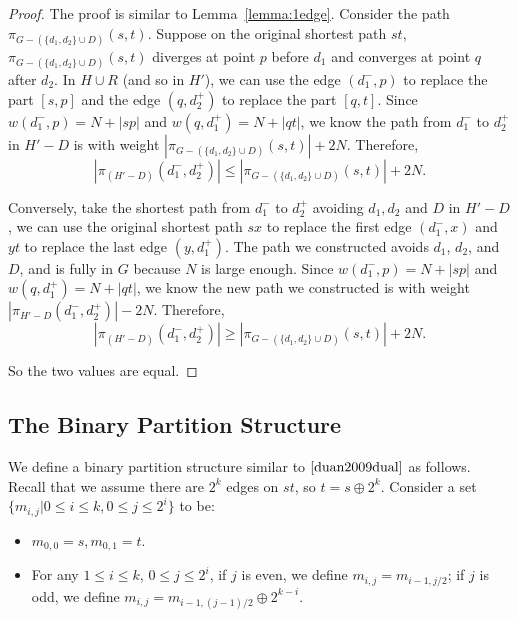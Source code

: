 \documentclass[11pt]{article}
\theoremstyle{plain}
\theoremstyle{definition}
\newcommand{\set}[1]{\{ #1 \}}
\newcommand{\og}[3]{\pi_{G-#3}\left(#1,#2\right)}
\begin{document}
\begin{center}
\begin{tikzpicture}[x=0.75pt,y=0.75pt,yscale=-1,xscale=1]
\end{tikzpicture}
 \end{center}

\begin{proof}
    The proof is similar to Lemma~\ref{lemma:1edge}. Consider the path $\og{s}{t}{(\set{d_1, d_2}\cup D)}$. Suppose on the original shortest path $st$, $\og{s}{t}{(\set{d_1, d_2}\cup D)}$ diverges at point $p$ before $d_1$ and converges at point $q$ after $d_2$. In $H \cup R$ (and so in $H'$), we can use the edge $(d_1^-,p)$ to replace the part $[s,p]$ and the edge $(q,d_2^+)$ to replace the part $[q,t]$. Since $w(d_1^-,p) = N + |sp|$ and $w(q,d_1^+) = N + |qt|$, we know the path from $d_1^-$ to $d_2^+$ in $H'-D$ is with weight $|\og{s}{t}{(\set{d_1, d_2}\cup D)}|+2N$. Therefore, 
    \[|\pi_{(H'-D)}(d_1^-, d_2^+)| \leq |\og{s}{t}{(\set{d_1, d_2}\cup D)}|+2N.\]

    Conversely, take the shortest path from $d_1^-$ to $d_2^+$ avoiding $d_1,d_2$ and $D$ in $H'-D$, we can use the original shortest path $sx$ to replace the first edge $(d_1^-,x)$ and $yt$ to replace the last edge $(y,d_1^+)$. The path we constructed avoids $d_1$, $d_2$, and $D$, and is fully in $G$ because $N$ is large enough. Since $w(d_1^-,p) = N + |sp|$ and $w(q,d_1^+) = N + |qt|$, we know the new path we constructed is with weight $|\pi_{H'-D}(d_1^-, d_2^+)|-2N$. Therefore, 
    \[|\pi_{(H'-D)}(d_1^-, d_2^+)| \geq |\og{s}{t}{(\set{d_1, d_2}\cup D)}|+2N.\]

    So the two values are equal.
\end{proof}



\subsection{The Binary Partition Structure}
\label{sec:binary}

We define a binary partition structure similar to $\cite{duan2009dual}$ as follows. Recall that we assume there are $2^k$ edges on $st$, so $t=s \oplus 2^k$. Consider a set $\set{m_{i,j}|0 \leq i \leq k, 0 \leq j \leq 2^i}$ to be:

\begin{itemize}
    \item $m_{0,0} = s, m_{0,1}=t$.
    \item For any $1 \leq i \leq k$, $0 \leq j \leq 2^i$, if $j$ is even, we define $m_{i,j}=m_{i-1,j/2}$; if $j$ is odd, we define $m_{i,j}=m_{i-1,(j-1)/2} \oplus 2^{k-i}$.
\end{itemize}
\end{document}
